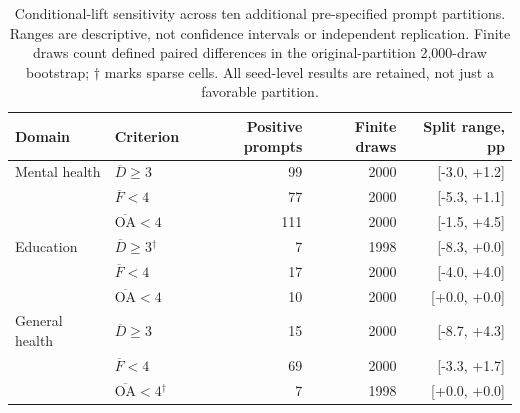 \begin{table}[htbp]
\centering\small
\caption{Conditional-lift sensitivity across ten additional pre-specified prompt partitions. Ranges are descriptive, not confidence intervals or independent replication. Finite draws count defined paired differences in the original-partition 2,000-draw bootstrap; $\dagger$ marks sparse cells. All seed-level results are retained, not just a favorable partition.}
\label{tab:split_sensitivity}
\begin{tabular}{llrrr}
\toprule
Domain & Criterion & Positive prompts & Finite draws & Split range, pp \\
\midrule
Mental health & $\overline D\geq3$ & 99 & 2000 & [-3.0, +1.2] \\
 & $\overline F<4$ & 77 & 2000 & [-5.3, +1.1] \\
 & $\overline{\mathrm{OA}}<4$ & 111 & 2000 & [-1.5, +4.5] \\
Education & $\overline D\geq3$$^{\dagger}$ & 7 & 1998 & [-8.3, +0.0] \\
 & $\overline F<4$ & 17 & 2000 & [-4.0, +4.0] \\
 & $\overline{\mathrm{OA}}<4$ & 10 & 2000 & [+0.0, +0.0] \\
General health & $\overline D\geq3$ & 15 & 2000 & [-8.7, +4.3] \\
 & $\overline F<4$ & 69 & 2000 & [-3.3, +1.7] \\
 & $\overline{\mathrm{OA}}<4$$^{\dagger}$ & 7 & 1998 & [+0.0, +0.0] \\
\bottomrule
\end{tabular}
\end{table}
